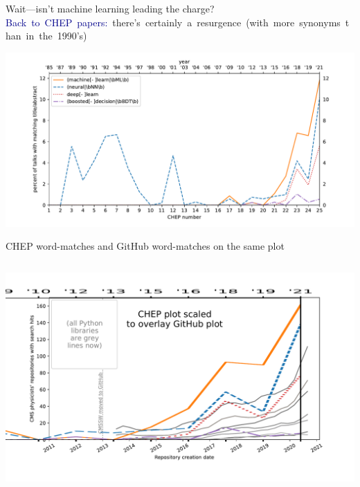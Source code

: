 \documentclass[aspectratio=169]{beamer}
\begin{document}
\begin{frame}{Wait---isn't machine learning leading the charge?}
\vspace{0.25 cm}
\mbox{\hspace{-0.5 cm}\textcolor{darkblue}{Back to CHEP papers:} there's certainly a resurgence (with more synonyms than in the 1990's)}

\includegraphics[width=\linewidth]{PLOTS/chep-papers-ml.pdf}
\end{frame}

\begin{frame}{CHEP word-matches and GitHub word-matches on the same plot}
\vspace{-0.25 cm}
\begin{columns}
\includegraphics[width=\linewidth]{PLOTS/gihub-search-python-ecosystem-overlay.pdf}
\end{columns}

\vspace{-6.25 cm}
\vspace{6.25 cm}
\end{frame}
\end{document}
